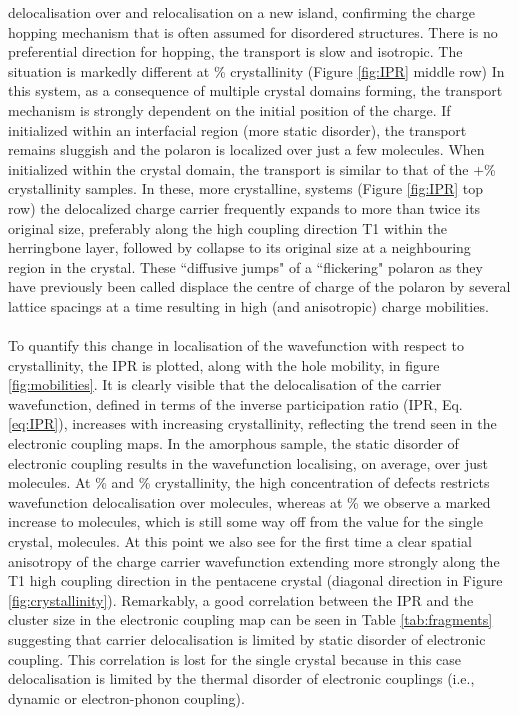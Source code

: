 delocalisation over and relocalisation on a new island, confirming the charge hopping mechanism that is often assumed for disordered structures.
There is no preferential direction for hopping, the transport is slow and isotropic. The situation is markedly different at \% crystallinity (Figure \ref{fig:IPR} middle row)
In this system, as a consequence of multiple crystal domains forming, the transport mechanism is strongly dependent on the initial position of the charge. If initialized within an interfacial region (more static disorder), the transport remains sluggish and the polaron is localized over just a few molecules. When initialized within the crystal domain, the transport is similar to that of the +\% crystallinity samples. In these, more crystalline, systems (Figure \ref{fig:IPR} top row)
the delocalized charge carrier frequently expands to more than twice its original size, preferably along the high coupling direction T1 within the herringbone layer, followed by collapse to its
original size at a neighbouring region in the crystal.  These ``diffusive jumps" of a ``flickering" polaron as they have previously been called \cite{FlickPolarons, Giannini2019}
displace the centre of charge of the polaron by several lattice spacings at a time resulting in high (and anisotropic) charge mobilities.
\\\\
To quantify this change in localisation of the wavefunction with respect to crystallinity, the IPR is plotted, along with the hole mobility, in figure \ref{fig:mobilities}. It is clearly visible that the delocalisation of the carrier wavefunction, defined in terms of the inverse participation ratio (IPR, Eq. \eqref{eq:IPR}), increases with increasing crystallinity, reflecting the trend seen in the electronic coupling maps. In the amorphous sample, the static disorder of electronic coupling results in the wavefunction localising, on average, over just  molecules. At \% and \% crystallinity, the high concentration of defects restricts wavefunction delocalisation over  molecules, whereas at \% we observe a marked increase to  molecules, which is still some way off from the value for the single crystal,  molecules.  At this point we also see for the first time a clear spatial anisotropy of the charge carrier wavefunction extending more strongly along the T1 high coupling direction in the pentacene crystal (diagonal direction in Figure \ref{fig:crystallinity}). Remarkably, a good correlation between the IPR and the cluster size in the electronic coupling map can be seen in Table \ref{tab:fragments} suggesting that carrier delocalisation is limited by static disorder of electronic coupling. This correlation is lost for the single crystal because in this case delocalisation is limited by the thermal disorder of electronic couplings (i.e., dynamic or electron-phonon coupling). 

